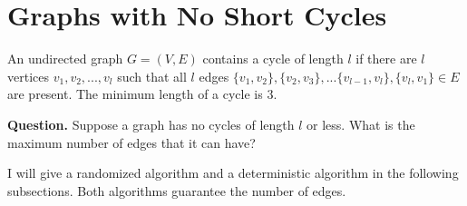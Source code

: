 \section{Graphs with No Short Cycles}
\begin{definition}
An undirected graph $G = (V,E)$ contains a cycle of length $l$ if there are $l$ vertices $v_1,v_2,...,v_l$ such that all $l$ edges $\{v_1,v_2\},\{v_2,v_3\},...\{v_{l−1},v_l\},\{v_l,v_1\} \in E$ are present. The minimum length of a cycle is $3$.
\end{definition}
\noindent\textbf{Question.} Suppose a graph has no cycles of length $l$ or less. What is the maximum number of edges that it can have?

I will give a randomized algorithm and a deterministic algorithm in the following subsections. Both algorithms guarantee the number of edges.

